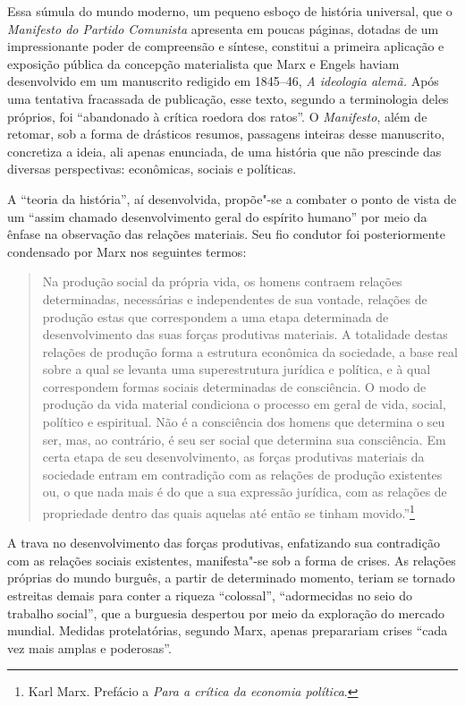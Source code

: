 Essa súmula do mundo moderno, um pequeno esboço de história universal,
que o \textit{Manifesto do Partido Comunista} apresenta em poucas
páginas, dotadas de um impressionante poder de compreensão e síntese,
constitui a primeira aplicação e exposição pública da concepção
materialista que Marx e Engels haviam desenvolvido em um manuscrito
redigido em 1845--46, \textit{A ideologia alemã.} Após uma tentativa
fracassada de publicação, esse texto, segundo a terminologia deles
próprios, foi “abandonado à crítica roedora dos ratos”. O
\textit{Manifesto}, além de retomar, sob a forma de drásticos resumos,
passagens inteiras desse manuscrito, concretiza a ideia, ali apenas
enunciada, de uma história que não prescinde das diversas perspectivas:
econômicas, sociais e políticas.

A “teoria da história”, aí desenvolvida, propõe"-se a combater o ponto
de vista de um “assim chamado desenvolvimento geral do espírito humano”
por meio da ênfase na observação das relações materiais. Seu fio
condutor foi posteriormente condensado por Marx nos seguintes termos: 

\begin{quote} 
Na produção social da própria vida, os homens contraem relações
determinadas, necessárias e independentes de sua vontade, relações de
produção estas que correspondem a uma etapa determinada de
desenvolvimento das suas forças produtivas materiais. A totalidade
destas relações de produção forma a estrutura econômica da sociedade, a
base real sobre a qual se levanta uma superestrutura jurídica e
política, e à qual correspondem formas sociais determinadas de
consciência. O modo de produção da vida material condiciona o processo
em geral de vida, social, político e espiritual. Não é a consciência
dos homens que determina o seu ser, mas, ao contrário, é seu ser social
que determina sua consciência. Em certa etapa de seu desenvolvimento,
as forças produtivas materiais da sociedade entram em contradição com
as relações de produção existentes  ou, o que nada mais é do que a sua
expressão jurídica, com as relações de propriedade dentro das quais
aquelas até então se tinham movido.”\footnote{ Karl Marx. Prefácio a
\textit{Para a crítica da economia política}.}
\end{quote} 

A trava no desenvolvimento das forças produtivas, enfatizando sua
contradição com as relações sociais existentes, manifesta"-se sob a
forma de crises. As relações próprias do mundo burguês, a partir de
determinado momento, teriam se tornado estreitas demais para
conter a riqueza “colossal”, “adormecidas no seio do trabalho social”,
que a burguesia despertou por meio da exploração do mercado mundial.
Medidas protelatórias, segundo Marx, apenas preparariam crises “cada
vez mais amplas e poderosas”.

